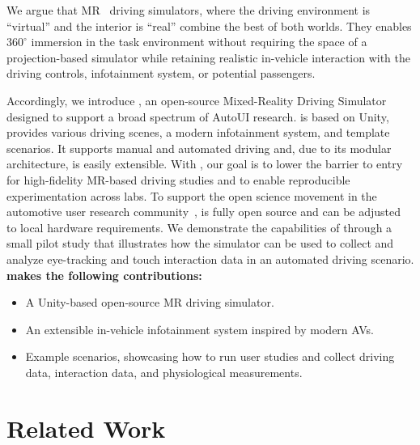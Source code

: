\documentclass[sigconf, screen]{acmart}
\begin{document}
We argue that \gls{MR}~\cite{rauschnabel_what_2022} driving simulators, where the driving environment is ``virtual'' and the interior is ``real'' combine the best of both worlds. They enables $360^{\circ}$ immersion in the task environment without requiring the space of a projection-based simulator while retaining realistic in-vehicle interaction with the driving controls, infotainment system, or potential passengers.


Accordingly, we introduce \name, an open-source Mixed-Reality Driving Simulator designed to support a broad spectrum of AutoUI research. \name is based on Unity, provides various driving scenes, a modern infotainment system, and template scenarios. It supports manual and automated driving and, due to its modular architecture, is easily extensible. 
With \name, our goal is to lower the barrier to entry for high-fidelity MR-based driving studies and to enable reproducible experimentation across labs. To support the open science movement in the automotive user research community~\cite{ebel_changing_2024}, \name is fully open source and can be adjusted to local hardware requirements.
We demonstrate the capabilities of \name through a small pilot study that illustrates how the simulator can be used to collect and analyze eye-tracking and touch interaction data in an automated driving scenario.
\textbf{\name makes the following contributions: }

\begin{itemize}
    \item A Unity-based open-source \gls{MR} driving simulator.
    \item An extensible in-vehicle infotainment system inspired by modern \glspl{AV}.
    \item Example scenarios, showcasing how to run user studies and collect driving data, interaction data, and physiological measurements.
\end{itemize}



\section{Related Work}
\end{document}
